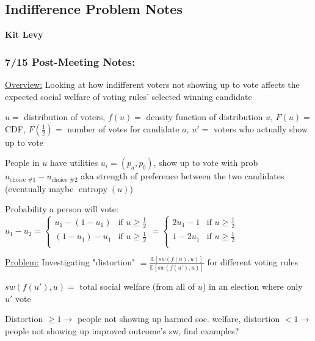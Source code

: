 \documentclass[12pt]{article}
\begin{document}
\setlength{\parindent}{0pt}
\setlength{\parskip}{2pt plus1pt}
\setlength{\baselineskip}{10pt plus1pt}

\subsection*{Indifference Problem Notes}
\textbf{Kit Levy}

\subsubsection*{7/15 Post-Meeting Notes:}

\underline{Overview:} Looking at how indifferent voters not showing up to vote affects the expected social welfare of voting rules' selected winning candidate
\newline

$u =$ distribution of voters, $f(u) =$ density function of distribution $u$, $F(u) =$ CDF, $F(\frac{1}{2}) =$ number of votes for candidate $a$, $u' =$  voters who actually show up to vote

People in $u$ have utilities $u_i = (p_a, p_b)$, show up to vote with prob $u_{\text{choice \#}1} - u_{\text{choice \#}2}$ aka strength of preference between the two candidates (eventually maybe $\operatorname{entropy}(u)$)

Probability a person will vote: $u_1 - u_2 = \begin{cases} 
u_1 - (1-u_1) & \text{if } u \geq \frac{1}{2} \\
(1 - u_1) - u_1 & \text{if } u \geq \frac{1}{2}\\
\end{cases} = \begin{cases} 
2u_1 - 1 & \text{if } u \geq \frac{1}{2} \\
1 - 2u_1 & \text{if } u \geq \frac{1}{2}\\
\end{cases}$
\newline \newline

\underline{Problem:} Investigating "distortion" $ = \frac{\mathbb{E}[sw(f(u), u)]}{\mathbb{E}[sw(f(u'), u)]}$ for different voting rules

$sw(f(u'), u) =$ total social welfare (from all of $u$) in an election where only $u'$ vote

Distortion $\geq 1 \rightarrow$ people not showing up harmed soc. welfare, distortion $< 1 \rightarrow$ people not showing up improved outcome's sw, find examples?
\end{document}
